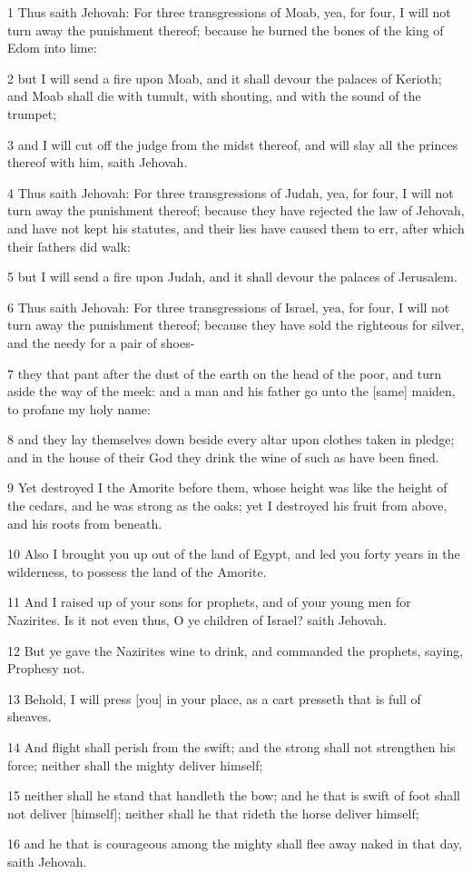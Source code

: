 \par 1 Thus saith Jehovah: For three transgressions of Moab, yea, for four, I will not turn away the punishment thereof; because he burned the bones of the king of Edom into lime:
\par 2 but I will send a fire upon Moab, and it shall devour the palaces of Kerioth; and Moab shall die with tumult, with shouting, and with the sound of the trumpet;
\par 3 and I will cut off the judge from the midst thereof, and will slay all the princes thereof with him, saith Jehovah.
\par 4 Thus saith Jehovah: For three transgressions of Judah, yea, for four, I will not turn away the punishment thereof; because they have rejected the law of Jehovah, and have not kept his statutes, and their lies have caused them to err, after which their fathers did walk:
\par 5 but I will send a fire upon Judah, and it shall devour the palaces of Jerusalem.
\par 6 Thus saith Jehovah: For three transgressions of Israel, yea, for four, I will not turn away the punishment thereof; because they have sold the righteous for silver, and the needy for a pair of shoes-
\par 7 they that pant after the dust of the earth on the head of the poor, and turn aside the way of the meek: and a man and his father go unto the [same] maiden, to profane my holy name:
\par 8 and they lay themselves down beside every altar upon clothes taken in pledge; and in the house of their God they drink the wine of such as have been fined.
\par 9 Yet destroyed I the Amorite before them, whose height was like the height of the cedars, and he was strong as the oaks; yet I destroyed his fruit from above, and his roots from beneath.
\par 10 Also I brought you up out of the land of Egypt, and led you forty years in the wilderness, to possess the land of the Amorite.
\par 11 And I raised up of your sons for prophets, and of your young men for Nazirites. Is it not even thus, O ye children of Israel? saith Jehovah.
\par 12 But ye gave the Nazirites wine to drink, and commanded the prophets, saying, Prophesy not.
\par 13 Behold, I will press [you] in your place, as a cart presseth that is full of sheaves.
\par 14 And flight shall perish from the swift; and the strong shall not strengthen his force; neither shall the mighty deliver himself;
\par 15 neither shall he stand that handleth the bow; and he that is swift of foot shall not deliver [himself]; neither shall he that rideth the horse deliver himself;
\par 16 and he that is courageous among the mighty shall flee away naked in that day, saith Jehovah.


